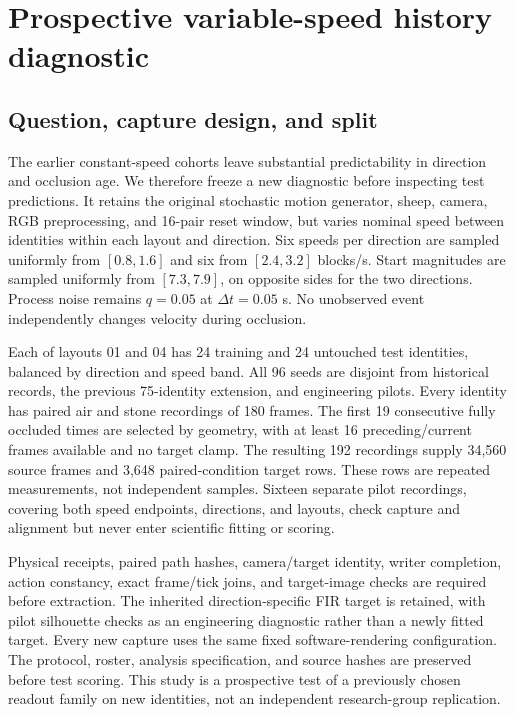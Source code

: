 \section{Prospective variable-speed history diagnostic}
\label{app:diagnostic}

\subsection{Question, capture design, and split}
The earlier constant-speed cohorts leave substantial predictability in direction and occlusion age. We therefore freeze a new diagnostic before inspecting test predictions. It retains the original stochastic motion generator, sheep, camera, RGB preprocessing, and 16-pair reset window, but varies nominal speed between identities within each layout and direction. Six speeds per direction are sampled uniformly from $[0.8,1.6]$ and six from $[2.4,3.2]$ blocks/s. Start magnitudes are sampled uniformly from $[7.3,7.9]$, on opposite sides for the two directions. Process noise remains $q=0.05$ at $\Delta t=0.05$ s. No unobserved event independently changes velocity during occlusion.

Each of layouts 01 and 04 has 24 training and 24 untouched test identities, balanced by direction and speed band. All 96 seeds are disjoint from historical records, the previous 75-identity extension, and engineering pilots. Every identity has paired air and stone recordings of 180 frames. The first 19 consecutive fully occluded times are selected by geometry, with at least 16 preceding/current frames available and no target clamp. The resulting 192 recordings supply 34,560 source frames and 3,648 paired-condition target rows. These rows are repeated measurements, not independent samples. Sixteen separate pilot recordings, covering both speed endpoints, directions, and layouts, check capture and alignment but never enter scientific fitting or scoring.

Physical receipts, paired path hashes, camera/target identity, writer completion, action constancy, exact frame/tick joins, and target-image checks are required before extraction. The inherited direction-specific FIR target is retained, with pilot silhouette checks as an engineering diagnostic rather than a newly fitted target. Every new capture uses the same fixed software-rendering configuration. The protocol, roster, analysis specification, and source hashes are preserved before test scoring. This study is a prospective test of a previously chosen readout family on new identities, not an independent research-group replication.

